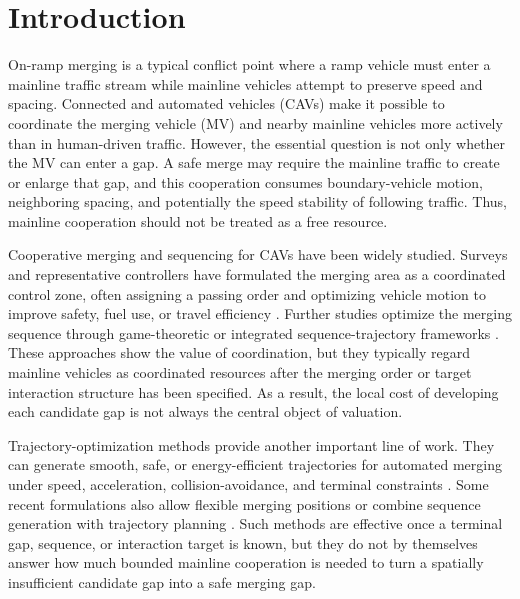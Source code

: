 \documentclass[conference]{IEEEtran}
\begin{document}
\section{Introduction}
On-ramp merging is a typical conflict point where a ramp vehicle must enter a
mainline traffic stream while mainline vehicles attempt to preserve speed and
spacing. Connected and automated vehicles (CAVs) make it possible to coordinate
the merging vehicle (MV) and nearby mainline vehicles more actively than in
human-driven traffic. However, the essential question is not only whether the MV
can enter a gap. A safe merge may require the mainline traffic to create or
enlarge that gap, and this cooperation consumes boundary-vehicle motion,
neighboring spacing, and potentially the speed stability of following traffic.
Thus, mainline cooperation should not be treated as a free resource.

Cooperative merging and sequencing for CAVs have been widely studied. Surveys
and representative controllers have formulated the merging area as a coordinated
control zone, often assigning a passing order and optimizing vehicle motion to
improve safety, fuel use, or travel efficiency
\cite{riosTorres2017survey,riosTorres2017automated}. Further studies optimize
the merging sequence through game-theoretic or integrated sequence-trajectory
frameworks \cite{jing2019cooperative,chen2024integrated}. These approaches show
the value of coordination, but they typically regard mainline vehicles as
coordinated resources after the merging order or target interaction structure
has been specified. As a result, the local cost of developing each candidate gap
is not always the central object of valuation.

Trajectory-optimization methods provide another important line of work. They
can generate smooth, safe, or energy-efficient trajectories for automated
merging under speed, acceleration, collision-avoidance, and terminal constraints
\cite{ntousakis2016optimal,karimi2020cooperative}. Some recent formulations
also allow flexible merging positions or combine sequence generation with
trajectory planning \cite{tang2022hierarchical,chen2024integrated}. Such methods
are effective once a terminal gap, sequence, or interaction target is known, but
they do not by themselves answer how much bounded mainline cooperation is needed
to turn a spatially insufficient candidate gap into a safe merging gap.
\end{document}
